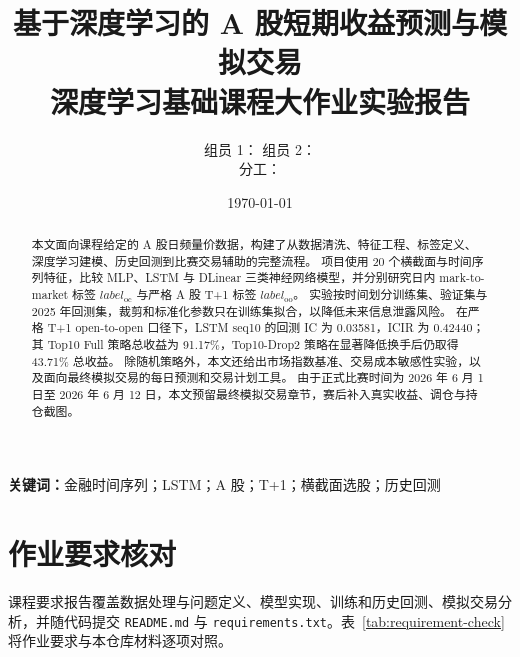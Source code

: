 \documentclass[UTF8,a4paper,11pt]{ctexart}
\title{\textbf{基于深度学习的 A 股短期收益预测与模拟交易}\\
  \large 深度学习基础课程大作业实验报告}
\author{
  组员 1：\todo{姓名、学号}\qquad
  组员 2：\todo{姓名、学号}\\[0.4em]
  分工：\todo{写明两位组员在数据、模型、回测、交易、报告中的具体工作}
}
\date{\today}
\begin{document}
\maketitle

\begin{abstract}
本文面向课程给定的 A 股日频量价数据，构建了从数据清洗、特征工程、标签定义、深度学习建模、历史回测到比赛交易辅助的完整流程。
项目使用 20 个横截面与时间序列特征，比较 MLP、LSTM 与 DLinear 三类神经网络模型，并分别研究日内 mark-to-market 标签
$label_{\mathrm{oc}}$ 与严格 A 股 T+1 标签 $label_{\mathrm{oo}}$。
实验按时间划分训练集、验证集与 2025 年回测集，裁剪和标准化参数只在训练集拟合，以降低未来信息泄露风险。
在严格 T+1 open-to-open 口径下，LSTM seq10 的回测 IC 为 0.03581，ICIR 为 0.42440；
其 Top10 Full 策略总收益为 91.17\%，Top10-Drop2 策略在显著降低换手后仍取得 43.71\% 总收益。
除随机策略外，本文还给出市场指数基准、交易成本敏感性实验，以及面向最终模拟交易的每日预测和交易计划工具。
由于正式比赛时间为 2026 年 6 月 1 日至 2026 年 6 月 12 日，本文预留最终模拟交易章节，赛后补入真实收益、调仓与持仓截图。
\end{abstract}

\textbf{关键词：}金融时间序列；LSTM；A 股；T+1；横截面选股；历史回测

\tableofcontents
\newpage

\section{作业要求核对}

课程要求报告覆盖数据处理与问题定义、模型实现、训练和历史回测、模拟交易分析，并随代码提交
\texttt{README.md} 与 \texttt{requirements.txt}。表~\ref{tab:requirement-check} 将作业要求与本仓库材料逐项对照。
\end{document}
